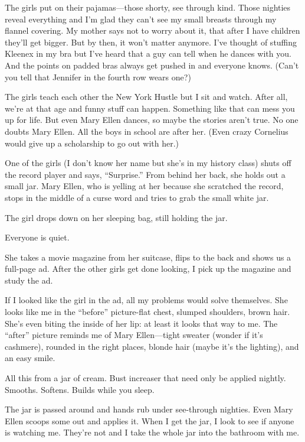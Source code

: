 \documentclass[
]{article}
\begin{document}
The girls put on their pajamas---those shorty, see through kind. Those
nighties reveal everything and I'm glad they can't see my small breasts
through my flannel covering. My mother says not to worry about it, that
after I have children they'll get bigger. But by then, it won't matter
anymore. I've thought of stuffing Kleenex in my bra but I've heard that
a guy can tell when he dances with you. And the points on padded bras
always get pushed in and everyone knows. (Can't you tell that Jennifer
in the fourth row wears one?)

The girls teach each other the New York Hustle but I sit and watch.
After all, we're at that age and funny stuff can happen. Something like
that can mess you up for life. But even Mary Ellen dances, so maybe the
stories aren't true. No one doubts Mary Ellen. All the boys in school
are after her. (Even crazy Cornelius would give up a scholarship to go
out with her.)

One of the girls (I don't know her name but she's in my history class)
shuts off the record player and says, ``Surprise.'' From behind her
back, she holds out a small jar. Mary Ellen, who is yell­ing at her
because she scratched the record, stops in the middle of a curse word
and tries to grab the small white jar.

The girl drops down on her sleeping bag, still holding the jar.

Everyone is quiet.

She takes a movie magazine from her suitcase, flips to the back and
shows us a full-page ad. After the other girls get done looking, I pick
up the magazine and study the ad.

If I looked like the girl in the ad, all my problems would solve
themselves. She looks like me in the ``before'' picture-flat chest,
slumped shoulders, brown hair. She's even biting the inside of her lip:
at least it looks that way to me. The ``after'' picture reminds me of
Mary Ellen---tight sweater (wonder if it's cashmere), rounded in the
right places, blonde hair (maybe it's the lighting), and an easy smile.

All this from a jar of cream. Bust increaser that need only be applied
nightly. Smooths. Softens. Builds while you sleep.

The jar is passed around and hands rub under see-through nighties. Even
Mary Ellen scoops some out and applies it. When I get the jar, I look to
see if anyone is watching me. They're not and I take the whole jar into
the bathroom with me.
\end{document}
